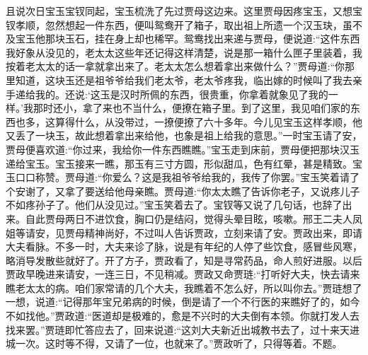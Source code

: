 \begin{parag}
    且说次日宝玉宝钗同起，宝玉梳洗了先过贾母这边来。这里贾母因疼宝玉，又想宝钗孝顺，忽然想起一件东西，便叫鸳鸯开了箱子，取出祖上所遗一个汉玉玦，虽不及宝玉他那块玉石，挂在身上却也稀罕。鸳鸯找出来递与贾母，便说道:“这件东西我好象从没见的，老太太这些年还记得这样清楚，说是那一箱什么匣子里装着，我按着老太太的话一拿就拿出来了。老太太怎么想着拿出来做什么？”贾母道:“你那里知道，这块玉还是祖爷爷给我们老太爷，老太爷疼我，临出嫁的时候叫了我去亲手递给我的。还说:‘这玉是汉时所佩的东西，很贵重，你拿着就象见了我的一样。’我那时还小，拿了来也不当什么，便撩在箱子里。到了这里，我见咱们家的东西也多，这算得什么，从没带过，一撩便撩了六十多年。今儿见宝玉这样孝顺，他又丢了一块玉，故此想着拿出来给他，也象是祖上给我的意思。”一时宝玉请了安，贾母便喜欢道:“你过来，我给你一件东西瞧瞧。”宝玉走到床前，贾母便把那块汉玉递给宝玉。宝玉接来一瞧，那玉有三寸方圆，形似甜瓜，色有红晕，甚是精致。宝玉口口称赞。贾母道:“你爱么？这是我祖爷爷给我的，我传了你罢。”宝玉笑着请了个安谢了，又拿了要送给他母亲瞧。贾母道:“你太太瞧了告诉你老子，又说疼儿子不如疼孙子了。他们从没见过。”宝玉笑着去了。宝钗等又说了几句话，也辞了出来。自此贾母两日不进饮食，胸口仍是结闷，觉得头晕目眩，咳嗽。邢王二夫人凤姐等请安，见贾母精神尚好，不过叫人告诉贾政，立刻来请了安。贾政出来，即请大夫看脉。不多一时，大夫来诊了脉，说是有年纪的人停了些饮食，感冒些风寒，略消导发散些就好了。开了方子，贾政看了，知是寻常药品，命人煎好进服。以后贾政早晚进来请安，一连三日，不见稍减。贾政又命贾琏:“打听好大夫，快去请来瞧老太太的病。咱们家常请的几个大夫，我瞧着不怎么好，所以叫你去。”贾琏想了一想，说道:“记得那年宝兄弟病的时候，倒是请了一个不行医的来瞧好了的，如今不如找他。”贾政道:“医道却是极难的，愈是不兴时的大夫倒有本领。你就打发人去找来罢。”贾琏即忙答应去了，回来说道:“这刘大夫新近出城教书去了，过十来天进城一次。这时等不得，又请了一位，也就来了。”贾政听了，只得等着。不题。
\end{parag}


